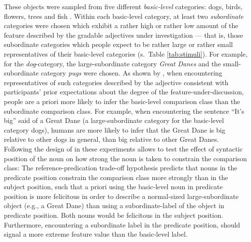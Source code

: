 These objects were sampled from five different \textit{basic-level} categories: dogs, birds, flowers, trees and fish \parencite{rosch1976}. Within each basic-level category, at least two \textit{subordinate} categories were chosen which exhibit a rather high or rather low amount of the feature described by the gradable adjectives under investigation --- that is, those subordinate categories which people expect to be rather large or rather small representatives of their basic-level categories (s.~Table \ref{tab:stimuli}). For example, for the \textit{dog}-category, the large-subordinate category \textit{Great Danes} and the small-subordinate category \textit{pugs} were chosen. As shown by \textcite{tessler2017warm}, when encountering representatives of such categories described by the adjective consistent with participants’ prior expectations about the degree of the feature-under-discussion, people are a priori more likely to infer the basic-level comparison class than the subordinate comparison class. For example, when encountering the sentence “It’s big” said of a Great Dane (a large-subordinate category for the basic-level category dogs), humans are more likely to infer that the Great Dane is big relative to other dogs in general, than big relative to other Great Danes.  
Following the design of \textcite{tessler2017warm} in these experiments allows to test the effect of syntactic position of the noun on how strong the noun is taken to constrain the comparison class: The reference-predication trade-off hypothesis predicts that nouns in the predicate position constrain the comparison class more strongly than in the subject position, such that a priori using the basic-level noun in predicate position is more felicitous in order to describe a normal-sized large-subordinate object (e.g., a Great Dane) than using a subordinate-label of the object in predicate position. Both nouns would be felicitous in the subject position. Furthermore, encountering a subordinate label in the predicate position, should signal a more extreme feature value than the basic-level label.
